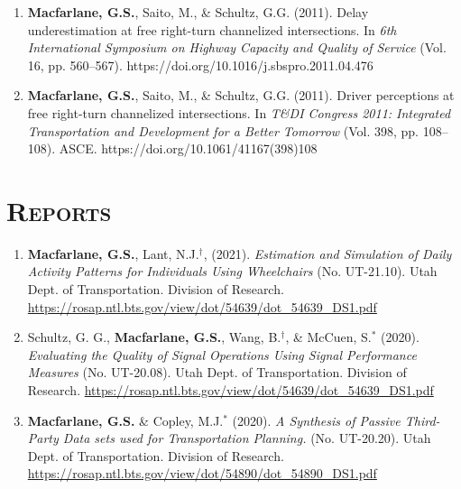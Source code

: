 \documentclass[margin,line]{res}
\newif\ifdetail
\newcounter{enuminitialize}
\newenvironment{myenum}[1][]
{%
 \setcounter{enuminitialize}{#1}
 \addtocounter{enuminitialize}{2}
 \begin{enumerate}[left= 4pt, itemsep=12pt, start=\value{enuminitialize}, label=\arabic*\addtocounter{enumi}{-2}]
}
{%
 \end{enumerate}
}
\newcommand{\secfont}{\scshape }
\begin{document}
\begin{resume}
\begin{myenum}[8]
\item \textbf{Macfarlane, G.S.}, Saito, M., \& Schultz, G.G. (2011). Delay underestimation at free right-turn channelized intersections. In \textit{ 6th International Symposium on Highway Capacity and Quality of Service} (Vol. 16, pp. 560–567). https://doi.org/10.1016/j.sbspro.2011.04.476 \ifdetail Citations: 6  \fi

\item \textbf{Macfarlane, G.S.}, Saito, M., \& Schultz, G.G. (2011). Driver perceptions at free right-turn channelized intersections. In \textit{ T\&DI Congress 2011: Integrated Transportation and Development for a Better Tomorrow} (Vol. 398, pp. 108–108). ASCE. https://doi.org/10.1061/41167(398)108 \ifdetail Citations: 3  \fi
\end{myenum}


\noindent\makebox[\linewidth]{\rule{\linewidth}{0.4pt}}
\section{\secfont Reports}
\ifdetail These are technical reports completed under contract for the sponsoring agency;
each report was reviewed by a technical advisory committee prior to publication. Item 1 resulted from postdoctoral activities at Georgia Tech, items 2 and 3 from my consulting practice, and items 4 through 6 from my work since joining BYU.\fi
\vspace{0.3cm}
\begin{myenum}[6]
\item \textbf{Macfarlane, G.S.}, Lant, N.J.$^\dagger$, (2021). \textit{Estimation and Simulation of Daily Activity Patterns for Individuals Using Wheelchairs} (No. UT-21.10). Utah Dept. of Transportation. Division of Research. \url{https://rosap.ntl.bts.gov/view/dot/54639/dot_54639_DS1.pdf}

\item Schultz, G. G., \textbf{Macfarlane, G.S.}, Wang, B.$^\dagger$, \& McCuen, S.$^*$ (2020). \textit{Evaluating the Quality of Signal Operations Using Signal Performance Measures} (No. UT-20.08). Utah Dept. of Transportation. Division of Research. \url{https://rosap.ntl.bts.gov/view/dot/54639/dot_54639_DS1.pdf}

\item \textbf{Macfarlane, G.S.} \& Copley, M.J.$^*$ (2020). \textit{ A Synthesis of Passive Third-Party Data sets used for Transportation Planning.} (No. UT-20.20). Utah Dept. of Transportation. Division of Research. \url{https://rosap.ntl.bts.gov/view/dot/54890/dot_54890_DS1.pdf}


\end{myenum}
\end{resume}
\end{document}
